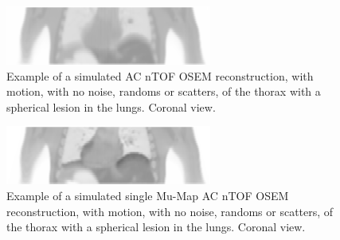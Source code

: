             \begin{figure}
                \centering
                
                \includegraphics[width=1.0\linewidth]{figures/background_motion_artefact_example.png}
                
                \captionsetup{singlelinecheck=false, justification=raggedright}
                \caption{Example of a simulated \gls{AC} \gls{nTOF} \gls{OSEM} reconstruction, with motion, with no noise, randoms or scatters, of the thorax with a spherical lesion in the lungs. Coronal view.}
                \label{fig:respiratory_motion_artefacts_motion_artefact}
            \end{figure}
            
            \begin{figure}
                \centering
                
                \includegraphics[width=1.0\linewidth]{figures/background_single_mu-map_ac_example.png}
                
                \captionsetup{singlelinecheck=false, justification=raggedright}
                \caption{Example of a simulated single \gls{Mu-Map} \gls{AC} \gls{nTOF} \gls{OSEM} reconstruction, with motion, with no noise, randoms or scatters, of the thorax with a spherical lesion in the lungs. Coronal view.}
                \label{fig:respiratory_motion_artefacts_single_mu-map_ac}
            \end{figure}
            
